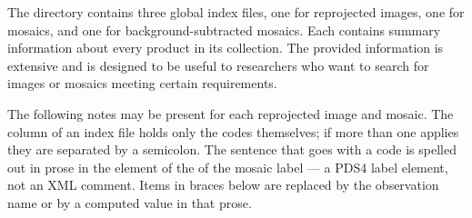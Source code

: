 The  directory contains three global index files, one for reprojected images, one for mosaics, and one for background-subtracted mosaics. Each contains summary information about every product in its collection. The provided information is extensive and is designed to be useful to researchers who want to search for images or mosaics meeting certain requirements.

The following notes may be present for each reprojected image and mosaic. The  column of an index file holds only the codes themselves; if more than one applies they are separated by a semicolon. The sentence that goes with a code is spelled out in prose in the  element of the  of the mosaic label — a PDS4 label element, not an XML comment. Items in braces below are replaced by the observation name or by a computed value in that prose.

